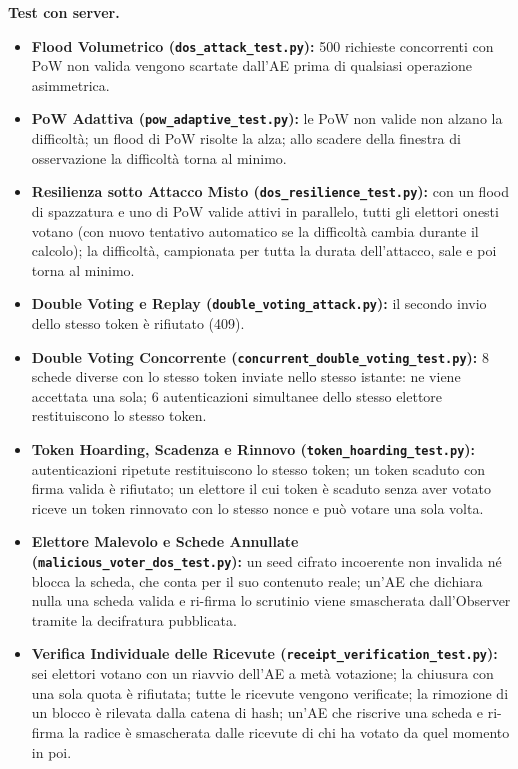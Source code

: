 \documentclass[12pt,a4paper]{article}
\begin{document}
\textbf{Test con server.}
\begin{itemize}
  \item \textbf{Flood Volumetrico (\texttt{dos\_attack\_test.py}):} 500 richieste concorrenti con PoW non valida vengono scartate dall'AE prima di qualsiasi operazione asimmetrica.
  \item \textbf{PoW Adattiva (\texttt{pow\_adaptive\_test.py}):} le PoW non valide non alzano la difficoltà; un flood di PoW risolte la alza; allo scadere della finestra di osservazione la difficoltà torna al minimo.
  \item \textbf{Resilienza sotto Attacco Misto (\texttt{dos\_resilience\_test.py}):} con un flood di spazzatura e uno di PoW valide attivi in parallelo, tutti gli elettori onesti votano (con nuovo tentativo automatico se la difficoltà cambia durante il calcolo); la difficoltà, campionata per tutta la durata dell'attacco, sale e poi torna al minimo.
  \item \textbf{Double Voting e Replay (\texttt{double\_voting\_attack.py}):} il secondo invio dello stesso token è rifiutato (409).
  \item \textbf{Double Voting Concorrente (\texttt{concurrent\_double\_voting\_test.py}):} 8 schede diverse con lo stesso token inviate nello stesso istante: ne viene accettata una sola; 6 autenticazioni simultanee dello stesso elettore restituiscono lo stesso token.
  \item \textbf{Token Hoarding, Scadenza e Rinnovo (\texttt{token\_hoarding\_test.py}):} autenticazioni ripetute restituiscono lo stesso token; un token scaduto con firma valida è rifiutato; un elettore il cui token è scaduto senza aver votato riceve un token rinnovato con lo stesso nonce e può votare una sola volta.
  \item \textbf{Elettore Malevolo e Schede Annullate (\texttt{malicious\_voter\_dos\_test.py}):} un seed cifrato incoerente non invalida né blocca la scheda, che conta per il suo contenuto reale; un'AE che dichiara nulla una scheda valida e ri-firma lo scrutinio viene smascherata dall'Observer tramite la decifratura pubblicata.
  \item \textbf{Verifica Individuale delle Ricevute (\texttt{receipt\_verification\_test.py}):} sei elettori votano con un riavvio dell'AE a metà votazione; la chiusura con una sola quota è rifiutata; tutte le ricevute vengono verificate; la rimozione di un blocco è rilevata dalla catena di hash; un'AE che riscrive una scheda e ri-firma la radice è smascherata dalle ricevute di chi ha votato da quel momento in poi.

\end{itemize}
\end{document}
